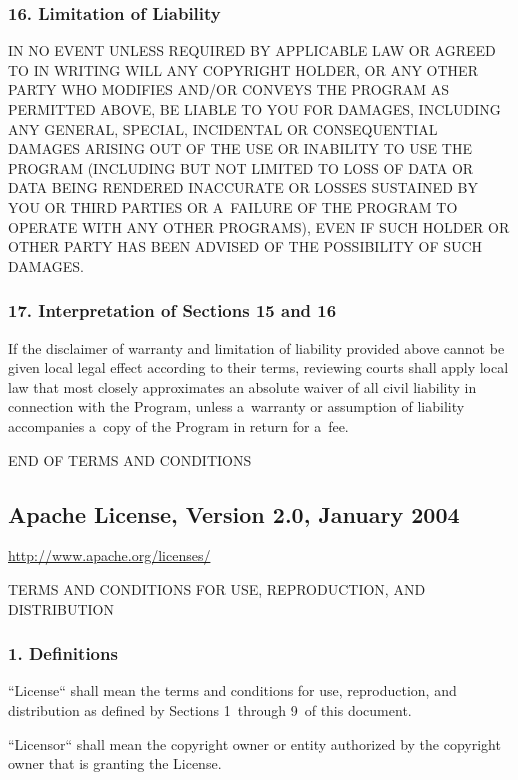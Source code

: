 \documentclass[a4paper, 11pt, twoside]{article}
\begin{document}
\subsubsection{16. Limitation of Liability}

IN NO EVENT UNLESS REQUIRED BY APPLICABLE LAW OR AGREED TO IN WRITING WILL ANY COPYRIGHT HOLDER, OR ANY OTHER PARTY WHO MODIFIES AND/OR CONVEYS THE PROGRAM AS PERMITTED ABOVE, BE LIABLE TO YOU FOR DAMAGES, INCLUDING ANY GENERAL, SPECIAL, INCIDENTAL OR CONSEQUENTIAL DAMAGES ARISING OUT OF THE USE OR INABILITY TO USE THE PROGRAM (INCLUDING BUT NOT LIMITED TO LOSS OF DATA OR DATA BEING RENDERED INACCURATE OR LOSSES SUSTAINED BY YOU OR THIRD PARTIES OR A~FAILURE OF THE PROGRAM TO OPERATE WITH ANY OTHER PROGRAMS), EVEN IF SUCH HOLDER OR OTHER PARTY HAS BEEN ADVISED OF THE POSSIBILITY OF SUCH DAMAGES.

\subsubsection{17. Interpretation of Sections 15 and 16}

If the disclaimer of warranty and limitation of liability provided above cannot be given local legal effect according to their terms, reviewing courts shall apply local law that most closely approximates an absolute waiver of all civil liability in connection with the Program, unless a~warranty or assumption of liability accompanies a~copy of the Program in return for a~fee.

END OF TERMS AND CONDITIONS

\subsection{Apache License, Version 2.0, January 2004}

\url{http://www.apache.org/licenses/}

TERMS AND CONDITIONS FOR USE, REPRODUCTION, AND DISTRIBUTION

\subsubsection{1. Definitions}

“License“ shall mean the terms and conditions for use, reproduction, and distribution as defined by Sections 1~through 9~of this document.

“Licensor“ shall mean the copyright owner or entity authorized by the copyright owner that is granting the License.
\end{document}
